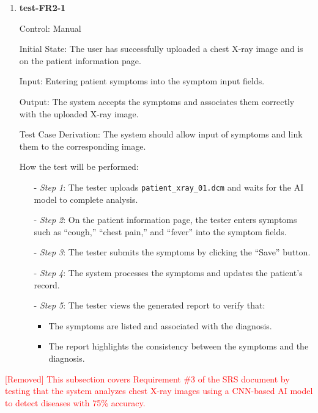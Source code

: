 \documentclass[12pt, titlepage]{article}
\begin{document}
\begin{enumerate}

\item \textbf{test-FR2-1} \label{test-FR2-1}

Control: Manual

Initial State: The user has successfully uploaded a chest X-ray image and is on the patient information page.

Input: Entering patient symptoms into the symptom input fields.

Output: The system accepts the symptoms and associates them correctly with the uploaded X-ray image.

Test Case Derivation: The system should allow input of symptoms and link them to the corresponding image.

How the test will be performed: 
\begin{itemize}
  \item[-] \textit{Step 1}: The tester uploads \texttt{patient\_xray\_01.dcm} and waits for the AI model to complete analysis.
  \item[-] \textit{Step 2}: On the patient information page, the tester enters symptoms such as  ``cough,'' ``chest pain,'' and ``fever'' into the symptom fields.
  \item[-] \textit{Step 3}: The tester submits the symptoms by clicking the ``Save'' button.
  \item[-] \textit{Step 4}: The system processes the symptoms and updates the patient's record.
  \item[-] \textit{Step 5}: The tester views the generated report to verify that:
    \begin{itemize}
      \item The symptoms are listed and associated with the diagnosis.
      \item The report highlights the consistency between the symptoms and the diagnosis.
    \end{itemize}
  \end{itemize}

\end{enumerate}
\textcolor{red}{[Removed] This subsection covers Requirement \#3 of the SRS document by testing that the system analyzes chest X-ray images using a CNN-based AI model to detect diseases with 75\% accuracy.}
\end{document}
